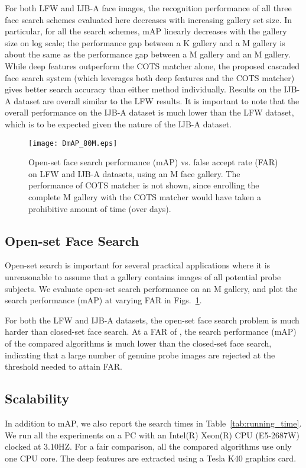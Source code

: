 \documentclass[10pt,journal,compsoc]{IEEEtran}
\begin{document}
For both LFW and IJB-A face images, the recognition performance of all three face search schemes evaluated here decreases with increasing gallery set size. In particular, for all the search schemes, mAP linearly decreases with the gallery size  on log scale; the performance gap between a K gallery and a M gallery is about the same as the performance gap between a M gallery and an M gallery. While deep features outperform the COTS matcher alone, the proposed cascaded face search system (which leverages both deep features and the COTS matcher) gives better search accuracy than either method individually. Results on the IJB-A dataset are overall similar to the LFW results. It is important to note that the overall performance on the IJB-A dataset is much lower than the LFW dataset, which is to be expected given the nature of the IJB-A dataset.
\begin{figure}[htbp]
  \centering
  \texttt{[image: DmAP\_80M.eps]}
  \caption{Open-set face search performance (mAP) vs. false accept rate (FAR) on LFW and IJB-A datasets, using an M face gallery. The performance of COTS matcher is not shown, since enrolling the complete M gallery with the COTS matcher would have taken a prohibitive amount of time (over  days).}
  \label{fig:exp_openset}
\end{figure}

\subsection{Open-set Face Search}
Open-set search is important for several practical applications where it is unreasonable to assume that a gallery contains images of all potential probe subjects. We evaluate open-set search performance on an M gallery, and plot the search performance (mAP) at varying FAR in Figs.~\ref{fig:exp_openset}.

For both the LFW and IJB-A datasets, the open-set face search problem is much harder than closed-set face search. At a FAR of , the search performance (mAP) of the compared algorithms is much lower than the closed-set face search, indicating that a large number of genuine probe images are rejected at the threshold needed to attain  FAR.

\subsection{Scalability}
In addition to mAP, we also report the search times in Table~\ref{tab:running_time}. We run all the experiments on a PC with an Intel(R) Xeon(R) CPU (E5-2687W) clocked at 3.10HZ. For a fair comparison, all the compared algorithms use only one CPU core. The deep features are extracted using a Tesla K40 graphics card.
\end{document}
